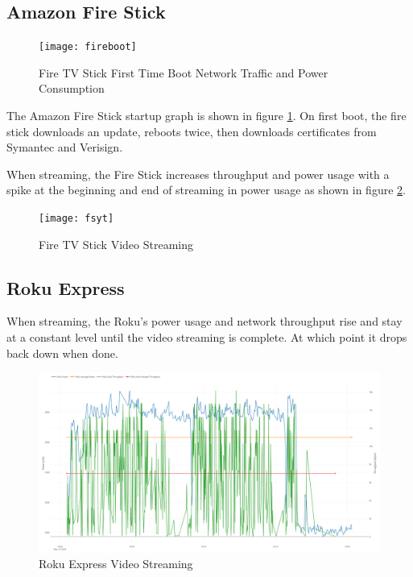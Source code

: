 \subsection{Amazon Fire Stick}

\begin{figure}[H]
  \centering
  \texttt{[image: fireboot]}
  \caption{Fire TV Stick First Time Boot Network Traffic and Power Consumption}
  \label{fig:fireboth}
\end{figure}

The Amazon Fire Stick startup graph is shown in figure \ref{fig:fireboth}. On first boot, the fire stick downloads an update, reboots twice, then downloads certificates from Symantec and Verisign.

When streaming, the Fire Stick increases throughput and power usage with a spike at the beginning and end of streaming in power usage as shown in figure \ref{fig:fsyt}.

\begin{figure}[H]
  \centering
  \texttt{[image: fsyt]}
  \caption{Fire TV Stick Video Streaming}
  \label{fig:fsyt}
\end{figure}

\subsection{Roku Express}
When streaming, the Roku's power usage and network throughput rise and stay at a constant level until the video streaming is complete. At which point it drops back down when done.

\begin{figure}[H]
  \centering
  \includegraphics[width=1\textwidth]{figures/rokuStreaming.png}
  \caption{Roku Express Video Streaming}
  \label{fig:rokuStreaming}
\end{figure}

